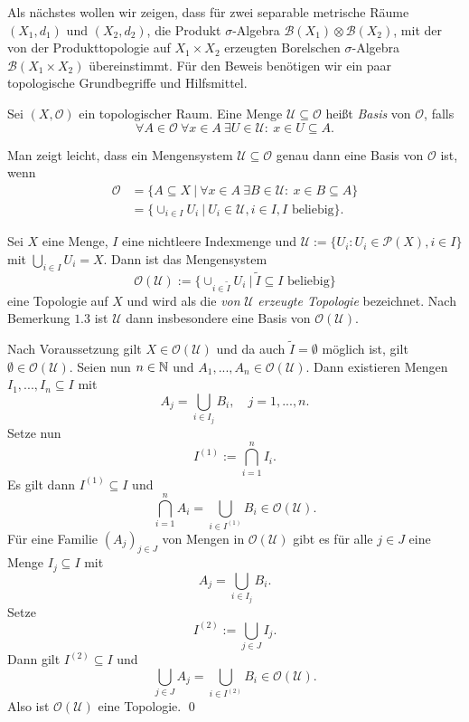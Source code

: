 Als nächstes wollen wir zeigen, dass für zwei separable metrische Räume $(X_1, d_1)$ und $(X_2,d_2)$, die Produkt $\sigma$-Algebra
$\mathcal{B}(X_1) \otimes \mathcal{B}(X_2)$, mit der von der Produkttopologie auf $X_1 \times X_2$ erzeugten Borelschen $\sigma$-Algebra $\mathcal{B}(X_1 \times X_2)$ übereinstimmt. 
Für den Beweis benötigen wir ein paar topologische Grundbegriffe und Hilfsmittel.
\begin{mydef}
    Sei $(X, \mathcal{O})$ ein topologischer Raum. Eine Menge $\mathcal{U} \subseteq \mathcal{O}$ heißt \textit{Basis} von $\mathcal{O}$, falls
    $$
        \forall A \in \mathcal{O} \ \forall x \in A \ \exists U \in \mathcal{U}: \ x \in U \subseteq A. 
    $$
\end{mydef}

\begin{remark}
    Man zeigt leicht, dass ein Mengensystem $\mathcal{U} \subseteq \mathcal{O}$ genau dann eine Basis von $\mathcal{O}$ ist, wenn
    \begin{align*}
        \mathcal{O} &= \{A \subseteq X \ | \ \forall x \in A \ \exists B \in \mathcal{U}: \ x \in B \subseteq A\} \\\
                    &= \{\cup_{i \in I}U_i \ | \ U_i \in \mathcal{U}, i \in I, I \text{ beliebig} \}. 
    \end{align*}
\end{remark}

\begin{lemma}
    Sei $X$ eine Menge, $I$ eine nichtleere Indexmenge und $\mathcal{U} := \{U_i: U_i \in \mathcal{P}(X), i \in I\}$ mit $\bigcup_{i \in I} U_i = X$. Dann ist das Mengensystem 
    $$
        \mathcal{O}(\mathcal{U}) := \{\cup_{i \in \tilde{I}}U_i \ | \  \tilde{I} \subseteq I \text{ beliebig} \}
    $$
    eine Topologie auf $X$ und wird als die \textit{von} $\mathcal{U}$ \textit{erzeugte Topologie} bezeichnet. Nach Bemerkung $1.3$ ist $\mathcal{U}$ dann insbesondere eine Basis von $\mathcal{O}(\mathcal{U})$. 
\end{lemma}

\begin{proof*}
    Nach Voraussetzung gilt $X \in \mathcal{O}(\mathcal{U})$ und da auch $\tilde{I} = \emptyset$ möglich ist, gilt $\emptyset \in \mathcal{O}(\mathcal{U})$. 
    Seien nun $n \in \mathbb{N}$ und $A_1,...,A_n \in \mathcal{O}(\mathcal{U})$. Dann existieren Mengen $I_1,...,I_n \subseteq I$ mit 
    $$
        A_j = \bigcup_{i \in I_j}B_i, \quad j=1,...,n.
    $$ 
    Setze nun
    $$
        I^{(1)} := \bigcap_{i=1}^n I_i. 
    $$
    Es gilt dann $I^{(1)} \subseteq I$ und 
    $$
        \bigcap_{i=1}^n A_i = \bigcup_{i \in I^{(1)}}B_i \in \mathcal{O}(\mathcal{U}). 
    $$
    Für eine Familie $(A_j)_{j \in J}$ von Mengen in $\mathcal{O}(\mathcal{U})$ gibt es für alle $j \in J$ eine Menge $I_j \subseteq I$ mit 
    $$
        A_j = \bigcup_{i \in I_j} B_i. 
    $$
    Setze
    $$
        I^{(2)} := \bigcup_{j \in J}I_j. 
    $$
    Dann gilt $I^{(2)} \subseteq I$ und 
    $$
       \bigcup_{j \in J}A_j =  \bigcup_{i\in I^{(2)}}B_i \in \mathcal{O}(\mathcal{U}).
    $$
    Also ist $\mathcal{O}(\mathcal{U})$ eine Topologie. \qed 
\end{proof*}

